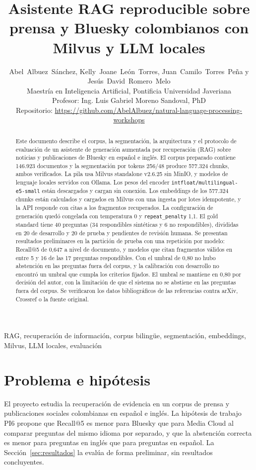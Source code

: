 \documentclass[conference]{IEEEtran}
\title{Asistente RAG reproducible sobre prensa y Bluesky colombianos con Milvus y LLM locales}
\author{\begin{minipage}{\textwidth}\centering\small
{\mbox{Abel Albuez Sánchez}, \mbox{Kelly Joane León Torres}, \mbox{Juan Camilo Torres Peña} y \mbox{Jesús David Romero Melo}}\\[2pt]
Maestría en Inteligencia Artificial, Pontificia Universidad Javeriana\\
Profesor: Ing. Luis Gabriel Moreno Sandoval, PhD\\
Repositorio: \url{https://github.com/AbelAlbuez/natural-language-processing-workshops}
\end{minipage}}
\begin{document}
\maketitle

\begin{abstract}
Este documento describe el corpus, la segmentación, la arquitectura y el protocolo de evaluación de un asistente de generación aumentada por recuperación (RAG) sobre noticias y publicaciones de Bluesky en español e inglés. El corpus preparado contiene 146.923 documentos y la segmentación por tokens 256/48 produce 577.324 chunks, ambos verificados. La pila usa Milvus standalone v2.6.25 sin MinIO, y modelos de lenguaje locales servidos con Ollama. Los pesos del encoder \texttt{intfloat/multilingual-e5-small} están descargados y cargan sin conexión. Los embeddings de los 577.324 chunks están calculados y cargados en Milvus con una ingesta por lotes idempotente, y la API responde con citas a los fragmentos recuperados. La configuración de generación quedó congelada con temperatura 0 y \texttt{repeat\_penalty} 1,1. El gold standard tiene 40 preguntas (34 respondibles sintéticas y 6 no respondibles), divididas en 20 de desarrollo y 20 de prueba y pendientes de revisión humana. Se presentan resultados preliminares en la partición de prueba con una repetición por modelo: Recall@5 de 0,647 a nivel de documento, y modelos que citan fragmentos válidos en entre 5 y 16 de las 17 preguntas respondibles. Con el umbral de 0,80 no hubo abstención en las preguntas fuera del corpus, y la calibración con desarrollo no encontró un umbral que cumpla los criterios fijados. El umbral se mantiene en 0,80 por decisión del autor, con la limitación de que el sistema no se abstiene en las preguntas fuera del corpus. Se verificaron los datos bibliográficos de las referencias contra arXiv, Crossref o la fuente original.
\end{abstract}

\begin{IEEEkeywords}
RAG, recuperación de información, corpus bilingüe, segmentación, embeddings, Milvus, LLM locales, evaluación
\end{IEEEkeywords}

\section{Problema e hipótesis}
\label{sec:problema}
El proyecto estudia la recuperación de evidencia en un corpus de prensa y publicaciones sociales colombianas en español e inglés. La hipótesis de trabajo PI6 propone que Recall@5 es menor para Bluesky que para Media Cloud al comparar preguntas del mismo idioma por separado, y que la abstención correcta es menor para preguntas en inglés que para preguntas en español. La Sección~\ref{sec:resultados} la evalúa de forma preliminar, sin resultados concluyentes.
\end{document}

